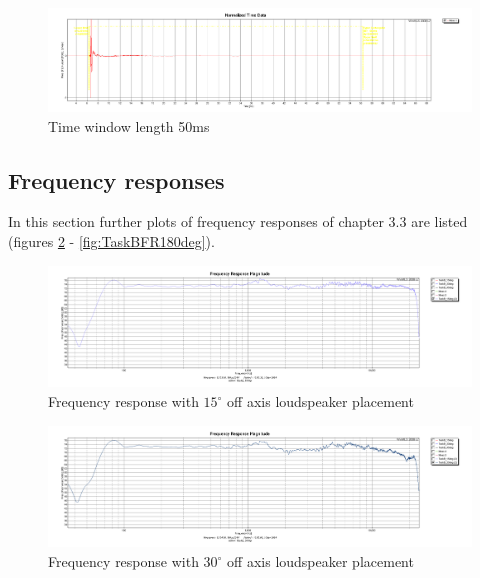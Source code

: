 \documentclass{article}
\begin{document}
\begin{figure}[htbp]
\begin{center}
\includegraphics[width=15cm,keepaspectratio=true]{Figures/TaskAtime50ms}
\caption{Time window length 50ms}
\label{fig:TaskAtime50ms}
\end{center}
\end{figure}
\clearpage
\subsection{Frequency responses}
In this section further plots of frequency responses of chapter 3.3 are listed (figures \ref{fig:TaskBFR15deg} - \ref{fig:TaskBFR180deg}).
\begin{figure}[htbp]
\begin{center}
\includegraphics[width=15cm,keepaspectratio=true]{Figures/TaskBFR15deg}
\caption{Frequency response with $15^\circ$ off axis loudspeaker placement}
\label{fig:TaskBFR15deg}
\end{center}
\end{figure}
\begin{figure}[htbp]
\begin{center}
\includegraphics[width=15cm,keepaspectratio=true]{Figures/TaskBFR30deg}
\caption{Frequency response with $30^\circ$ off axis loudspeaker placement}
\label{fig:TaskBFR30deg}
\end{center}
\end{figure}
\end{document}
